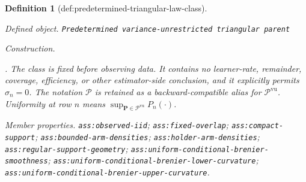 \documentclass{article}
\newtheorem{definition}{Definition}
\begin{document}
\begin{definition}[def:predetermined-triangular-law-class]\label{def:predetermined-triangular-law-class}
\par\smallskip\noindent\emph{Defined object.} \texttt{Predetermined variance-\allowbreak{}unrestricted triangular parent}
\par\smallskip\noindent\emph{Construction.} \par\noindent {}\par\noindent.  The class is fixed before observing data.  It contains no learner-rate, remainder, coverage, efficiency, or other estimator-side conclusion, and it explicitly permits \(\sigma_n=0\).  The notation \(\mathscr P\) is retained as a backward-compatible alias for \(\mathscr P^{\mathrm{vu}}\).  Uniformity at row \(n\) means \(\sup_{\mathbf P\in\mathscr P^{\mathrm{vu}}}P_n(\cdot)\).
\par\smallskip\noindent\emph{Member properties.} \texttt{ass:\allowbreak{}observed-\allowbreak{}iid}; \texttt{ass:\allowbreak{}fixed-\allowbreak{}overlap}; \texttt{ass:\allowbreak{}compact-\allowbreak{}support}; \texttt{ass:\allowbreak{}bounded-\allowbreak{}arm-\allowbreak{}densities}; \texttt{ass:\allowbreak{}holder-\allowbreak{}arm-\allowbreak{}densities}; \texttt{ass:\allowbreak{}regular-\allowbreak{}support-\allowbreak{}geometry}; \texttt{ass:\allowbreak{}uniform-\allowbreak{}conditional-\allowbreak{}brenier-\allowbreak{}smoothness}; \texttt{ass:\allowbreak{}uniform-\allowbreak{}conditional-\allowbreak{}brenier-\allowbreak{}lower-\allowbreak{}curvature}; \texttt{ass:\allowbreak{}uniform-\allowbreak{}conditional-\allowbreak{}brenier-\allowbreak{}upper-\allowbreak{}curvature}.
\end{definition}
\end{document}

